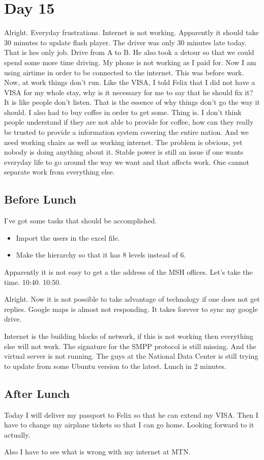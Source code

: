 \section{Day 15}
Alright. Everyday frustrations. 
Internet is not working. Apparently it should take 30 minutes to update flash player.
The driver was only 30 minutes late today. That is hes only job. 
Drive from A to B. He also took a detour so that we could spend some more time driving.
My phone is not working as I paid for. 
Now I am using airtime in order to be connected to the internet.
This was before work. Now, at work things don't run.
Like the VISA, I told Felix that I did not have a VISA for my whole stay, why is it necessary for me to say that he should fix it? It is like people don't listen.
That is the essence of why things don't go the way it should.
I also had to buy coffee in order to get some.
Thing is. I don't think people understand if they are not able to provide for coffee, how can they really be trusted to provide a information system covering the entire nation.
And we need working chairs as well as working internet.
The problem is obvious, yet nobody is doing anything about it.
Stable power is still an issue if one wants everyday life to go around the way we want and that affects work. One cannot separate work from everything else.

\subsection{Before Lunch}
I've got some tasks that should be accomplished. 
\begin{itemize}
	\item Import the users in the excel file.
	\item Make the hierarchy so that it has 8 levels instead of 6.
\end{itemize}

Apparently it is not easy to get a the address of the MSH offices.
Let's take the time. 10:40. 10:50.

Alright. Now it is not possible to take advantage of technology if one does not get replies.
Google maps is almost not responding. It takes forever to sync my google drive.


Internet is the building blocks of network, if this is not working then everything else will not work. The signature for the SMPP protocol is still missing. And the virtual server is not running.
The guys at the National Data Center is still trying to update from some Ubuntu version to the latest. Lunch in 2 minutes.

\subsection{After Lunch}
Today I will deliver my passport to Felix so that he can extend my VISA. Then I have to change my airplane tickets so that I can go home. Looking forward to it actually.

Also I have to see what is wrong with my internet at MTN.
